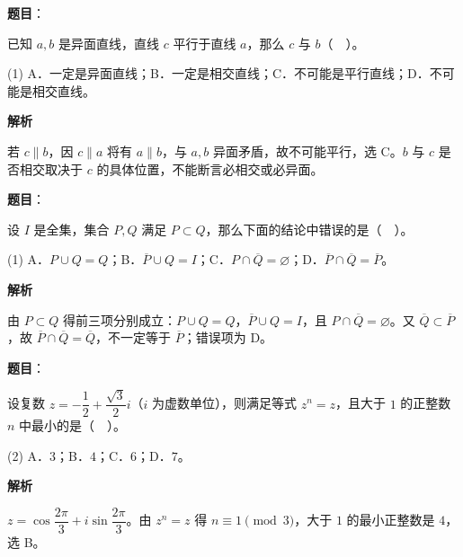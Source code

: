 \begin{answer}

\textbf{题目}：

已知 $a,b$ 是异面直线，直线 $c$ 平行于直线 $a$，那么 $c$ 与 $b$（　）。

\begin{gkopts}(1)
\task A．一定是异面直线；B．一定是相交直线；C．不可能是平行直线；D．不可能是相交直线。
\end{gkopts}

\textbf{解析}

若 $c\parallel b$，因 $c\parallel a$ 将有 $a\parallel b$，与 $a,b$ 异面矛盾，故不可能平行，选 C。$b$ 与 $c$ 是否相交取决于 $c$ 的具体位置，不能断言必相交或必异面。


\end{answer}
\begin{answer}

\textbf{题目}：

设 $I$ 是全集，集合 $P,Q$ 满足 $P\subset Q$，那么下面的结论中错误的是（　）。

\begin{gkopts}(1)
\task A．$P\cup Q=Q$；B．$\overline P\cup Q=I$；C．$P\cap\overline Q=\varnothing$；D．$\overline P\cap\overline Q=\overline P$。
\end{gkopts}

\textbf{解析}

由 $P\subset Q$ 得前三项分别成立：$P\cup Q=Q$，$\overline P\cup Q=I$，且 $P\cap\overline Q=\varnothing$。又 $\overline Q\subset\overline P$，故 $\overline P\cap\overline Q=\overline Q$，不一定等于 $\overline P$；错误项为 D。


\end{answer}
\begin{answer}

\textbf{题目}：

设复数 $z=-\dfrac12+\dfrac{\sqrt3}{2}i$（$i$ 为虚数单位），则满足等式 $z^n=z$，且大于 $1$ 的正整数 $n$ 中最小的是（　）。

\begin{gkopts}(2)
\task A．$3$；B．$4$；C．$6$；D．$7$。
\end{gkopts}

\textbf{解析}

$z=\cos\dfrac{2\pi}3+i\sin\dfrac{2\pi}3$。由 $z^n=z$ 得 $n\equiv1\pmod3$，大于 $1$ 的最小正整数是 $4$，选 B。


\end{answer}
